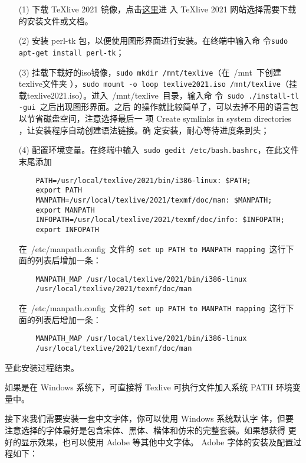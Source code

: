 \begin{enumerate}
\item[(1)] 下载 \TeX{}live 2021 镜像，点击\href{https://tug.org/texlive/}{这里}进
  入 \TeX{}live 2021 网站选择需要下载的安装文件或文档。
\item[(2)] 安装 perl-tk 包，以便使用图形界面进行安装。在终端中输入命
  令\texttt{sudo apt-get install perl-tk}；
\item[(3)] 挂载下载好的iso镜像，\texttt{sudo mkdir
    /mnt/texlive}（在~{/mnt}~下创建texlive文件夹
  ），\texttt{sudo mount -o loop texlive2021.iso
    /mnt/texlive}（挂载texlive2021.iso）。进入~/mnt/texlive~目录，输入命
  令~\texttt{sudo ./install-tl -gui}~之后出现图形界面。之后
  的操作就比较简单了，可以去掉不用的语言包以节省磁盘空间，注意选择最后一
  项 Create symlinks in system directories ，让安装程序自动创建语法链接。确
  定安装，耐心等待进度条到头；
\item[(4)] 配置环境变量。在终端中输入~\texttt{sudo gedit /etc/bash.bashrc}，在此文件末尾添加

  \begin{lstlisting}
    PATH=/usr/local/texlive/2021/bin/i386-linux: $PATH;
    export PATH
    MANPATH=/usr/local/texlive/2021/texmf/doc/man: $MANPATH;
    export MANPATH
    INFOPATH=/usr/local/texlive/2021/texmf/doc/info: $INFOPATH;
    export INFOPATH
  \end{lstlisting}

  在~{/etc/manpath.config}~文件的~\texttt{set up PATH to
    MANPATH mapping}~这行下面的列表后增加一条：
  \begin{lstlisting}
    MANPATH_MAP /usr/local/texlive/2021/bin/i386-linux
    /usr/local/texlive/2021/texmf/doc/man
  \end{lstlisting}

  在~{/etc/manpath.config}~文件的~\texttt{set up PATH to
    MANPATH mapping}~这行下面的列表后增加一条：
  \begin{lstlisting}
    MANPATH_MAP /usr/local/texlive/2021/bin/i386-linux
    /usr/local/texlive/2021/texmf/doc/man
  \end{lstlisting}
\end{enumerate}
至此安装过程结束。

如果是在 Windows 系统下，可直接将 Texlive 可执行文件加入系统 PATH 环境变量中。

接下来我们需要安装一套中文字体，你可以使用 Windows 系统默认字
体，但要注意选择的字体最好是包含宋体、黑体、楷体和仿宋的完整套装。如果想获得
更好的显示效果，也可以使用 Adobe 等其他中文字体。 Adobe 字体的安装及配置过程如下：

